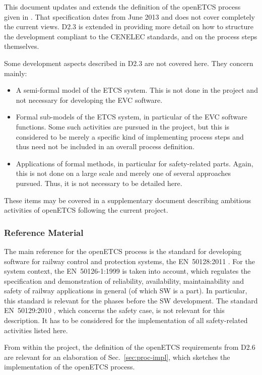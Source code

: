 \documentclass{template/openetcs_article}
\begin{document}
This document updates and extends the definition of the openETCS
process given in \cite{openETCS:D2.3}. That specification dates from
June 2013 and does not cover completely the current views. D2.3 is
extended in providing more detail on how to structure the development
compliant to the CENELEC standards, and on the process steps
themselves. 

Some development aspects described in D2.3 are not covered here. They
concern mainly: 
\begin{itemize}
\item A semi-formal model of the ETCS system. This is not done in the
  project and not necessary for developing the EVC software.
\item Formal sub-models of the ETCS system, in particular of the EVC
  software functions. Some such activities are pursued in the project,
  but this is considered to be merely a specific kind of implementing
  process steps and thus need not be included in an overall process
  definition. 
\item Applications of formal methods, in particular for safety-related
  parts. Again, this is not done on a large scale and merely one of
  several approaches pursued. Thus, it is not necessary to be detailed
  here.
\end{itemize}
%
These items may be covered in a supplementary document describing
ambitious activities of openETCS following the current project.

\subsubsection{Reference Material}
\label{sec:reference-material}

The main reference for the openETCS process is the standard for
developing software for railway control and protection systems, the
EN~50128:2011 \cite{EN50128:2011}. For the system context, the
EN~50126-1:1999 \cite{EN50126:1999} is taken into account, which
regulates the specification and demonstration of reliability,
availability, maintainability and safety of railway applications in
general (of which SW is a part). In particular, this standard is
relevant for the phases before the SW development. The standard
EN~50129:2010 \cite{EN50129:2010}, which concerns the safety case, is
not relevant for this description. It has to be considered for the
implementation of all safety-related activities listed here.


From within the project, the definition of the openETCS requirements
from D2.6 \citep{openETCS:D2.6} are relevant for an elaboration of
Sec.~\ref{sec:proc-impl}, which sketches the implementation of the
openETCS process.
\end{document}
